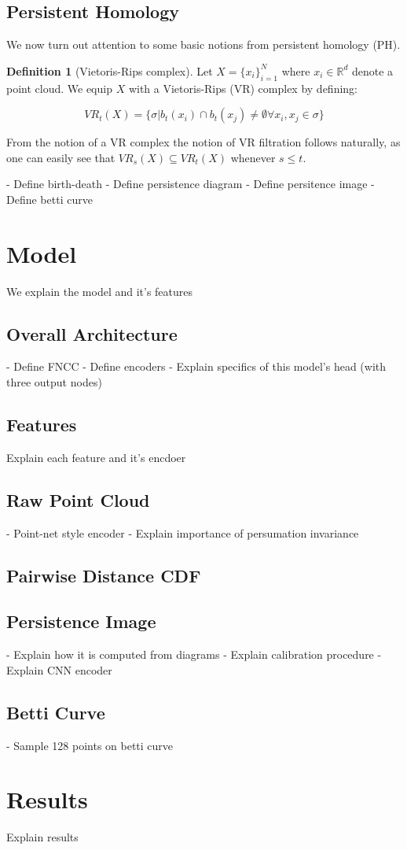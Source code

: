 \documentclass[letterpaper]{article}
\newcommand{\R}{\mathbb{R}}
\newcommand{\1}{\mathds{1}}
\theoremstyle{plain}
\theoremstyle{definition}
\newtheorem{definition}[theorem]{Definition}
\theoremstyle{remark}
\begin{document}
\subsection{Persistent Homology}
We now turn out attention to some basic notions from persistent homology (PH).

    \begin{definition}[Vietoris-Rips complex]
        Let $X = \{x_i\}_{i=1}^N$ where $x_i \in \R^d$ denote a point cloud. We equip $X$ with a Vietoris-Rips (VR) complex by defining:
            
            \[
            VR_t(X) = \{\sigma | b_t(x_i) \cap b_t(x_j) \neq \emptyset \forall x_i, x_j \in \sigma\}
            \]
    \end{definition}

From the notion of a VR complex the notion of VR filtration follows naturally, as one can easily see that $VR_s(X) \subseteq VR_t(X)$ whenever $s \leq t$.


- Define birth-death
- Define persistence diagram
- Define persitence image
- Define betti curve

\section{Model}
We explain the model and it's features

\subsection{Overall Architecture}
- Define FNCC
- Define encoders
- Explain specifics of this model's head (with three output nodes)

\subsection{Features}
Explain each feature and it's encdoer

\subsection{Raw Point Cloud}
- Point-net style encoder
- Explain importance of persumation invariance

\subsection{Pairwise Distance CDF}

\subsection{Persistence Image}
- Explain how it is computed from diagrams
- Explain calibration procedure
- Explain CNN encoder

\subsection{Betti Curve}
- Sample 128 points on betti curve


\section{Results}
Explain results
\end{document}
